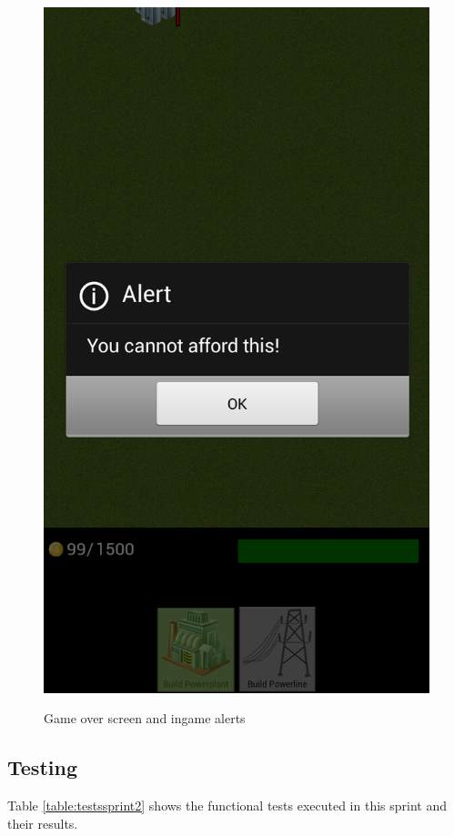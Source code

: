 \begin{figure}[H]
{		\includegraphics[scale=0.17]{pictures/sprint2-screen/sprint2-11}
	}
	\caption{Game over screen and ingame alerts}
	\end{figure}

\clearpage
\subsection{Testing}

	Table \ref{table:testssprint2} shows the functional tests executed in this sprint and their results.


